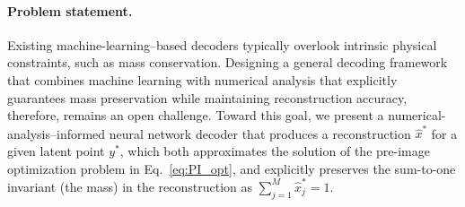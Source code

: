 \documentclass{article}
\DeclareMathOperator*{\argmin}{argmin}
\begin{document}

\paragraph{Problem statement.} Existing machine-learning–based decoders typically overlook intrinsic physical constraints, such as mass conservation. Designing a general decoding framework that combines machine learning with numerical analysis that explicitly guarantees mass preservation while maintaining reconstruction accuracy, therefore, remains an open challenge. Toward this goal, we present a numerical-analysis–informed neural network decoder that produces a reconstruction $\hat{x}^*$ for a given latent point $y^*$, which both approximates the solution of the pre-image optimization problem in Eq.~\eqref{eq:PI_opt}, and explicitly preserves the sum-to-one invariant (the mass) in the reconstruction as $\sum_{j=1}^M\hat{x}^*_{j}=1$. 
\end{document}
